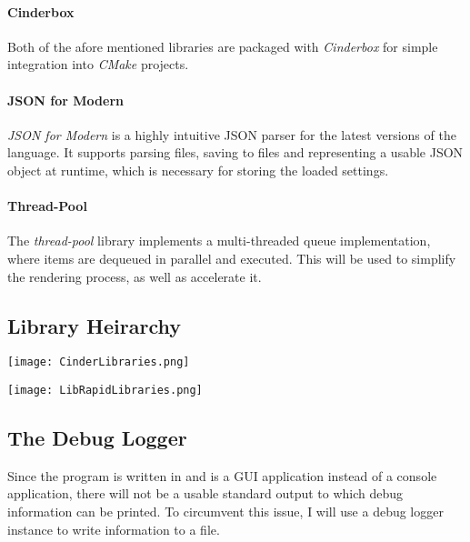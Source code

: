 \paragraph{Cinderbox} Both of the afore mentioned libraries are packaged with \textit{Cinderbox} for simple integration into \textit{CMake} projects.

\paragraph{JSON for Modern \CPP \cite{Lohmann_JSON_for_Modern_2022}} \textit{JSON for Modern \CPP} is a highly intuitive JSON parser for the latest versions of the language. It supports parsing files, saving to files and representing a usable JSON object at runtime, which is necessary for storing the loaded settings.

\paragraph{Thread-Pool \cite{Shoshany_A_C_17_Thread_2021}} The \textit{thread-pool} library implements a multi-threaded queue implementation, where items are dequeued in parallel and executed. This will be used to simplify the rendering process, as well as accelerate it.

\subsection{Library Heirarchy}

\FloatBarrier
\begin{figure*}[htp]
	\centering
	\texttt{[image: CinderLibraries.png]}
\end{figure*}
\FloatBarrier

\FloatBarrier
\begin{figure*}[htp]
	\centering
	\texttt{[image: LibRapidLibraries.png]}
\end{figure*}
\FloatBarrier

\subsection{The Debug Logger}

Since the program is written in \CPP and is a GUI application instead of a console application, there will not be a usable standard output to which debug information can be printed. To circumvent this issue, I will use a debug logger instance to write information to a file.

